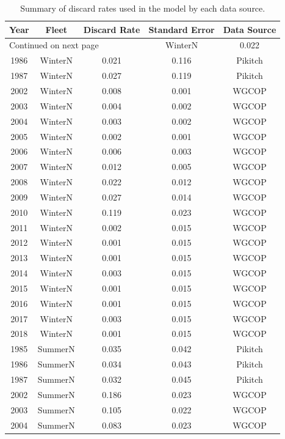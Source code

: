 \documentclass[12pt,]{article}
\begin{document}
\begin{longtable}{ccccc}
\caption{Summary of discard rates used in the model by each data source.} \\ 
  \hline
Year & Fleet & Discard Rate & Standard Error & Data Source \\ 
  \hline 
\endhead 
\hline 
\multicolumn{3}{l}{\footnotesize Continued on next page} 
\endfoot 
\endlastfoot 
 \hline
1985 & WinterN & 0.022 & 0.110 & Pikitch \\ 
  1986 & WinterN & 0.021 & 0.116 & Pikitch \\ 
  1987 & WinterN & 0.027 & 0.119 & Pikitch \\ 
  2002 & WinterN & 0.008 & 0.001 & WGCOP \\ 
  2003 & WinterN & 0.004 & 0.002 & WGCOP \\ 
  2004 & WinterN & 0.003 & 0.002 & WGCOP \\ 
  2005 & WinterN & 0.002 & 0.001 & WGCOP \\ 
  2006 & WinterN & 0.006 & 0.003 & WGCOP \\ 
  2007 & WinterN & 0.012 & 0.005 & WGCOP \\ 
  2008 & WinterN & 0.022 & 0.012 & WGCOP \\ 
  2009 & WinterN & 0.027 & 0.014 & WGCOP \\ 
  2010 & WinterN & 0.119 & 0.023 & WGCOP \\ 
  2011 & WinterN & 0.002 & 0.015 & WGCOP \\ 
  2012 & WinterN & 0.001 & 0.015 & WGCOP \\ 
  2013 & WinterN & 0.001 & 0.015 & WGCOP \\ 
  2014 & WinterN & 0.003 & 0.015 & WGCOP \\ 
  2015 & WinterN & 0.001 & 0.015 & WGCOP \\ 
  2016 & WinterN & 0.001 & 0.015 & WGCOP \\ 
  2017 & WinterN & 0.003 & 0.015 & WGCOP \\ 
  2018 & WinterN & 0.001 & 0.015 & WGCOP \\ 
  1985 & SummerN & 0.035 & 0.042 & Pikitch \\ 
  1986 & SummerN & 0.034 & 0.043 & Pikitch \\ 
  1987 & SummerN & 0.032 & 0.045 & Pikitch \\ 
  2002 & SummerN & 0.186 & 0.023 & WGCOP \\ 
  2003 & SummerN & 0.105 & 0.022 & WGCOP \\ 
  2004 & SummerN & 0.083 & 0.023 & WGCOP \\ 

\end{longtable}
\end{document}
